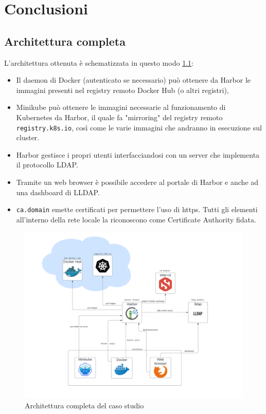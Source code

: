 \documentclass[12pt]{report}
\begin{document}
\chapter{Conclusioni}
\section{Architettura completa}
L'architettura ottenuta è schematizzata in questo modo \ref{image:gen-arch}:
\begin{itemize}
    \item Il daemon di Docker (autenticato se necessario) può ottenere da Harbor le immagini presenti nel registry remoto Docker Hub (o altri registri),
    \item Minikube può ottenere le immagini necessarie al funzionamento di Kubernetes da Harbor, il quale fa "mirroring" del registry remoto \texttt{registry.k8s.io}, così come le varie immagini che andranno in esecuzione sul cluster.
    \item Harbor gestisce i propri utenti interfacciandosi con un server che implementa il protocollo LDAP.
    \item Tramite un web browser è possibile accedere al portale di Harbor e anche ad una dashboard di LLDAP.
    \item \texttt{ca.domain} emette certificati per permettere l'uso di https. Tutti gli elementi all'interno della rete locale la riconoscono come Certificate Authority fidata.
\end{itemize}
\begin{figure}[h]
    \centering
    \includegraphics[width=\textwidth]{images/arch-gen.png}
    \caption{Architettura completa del caso studio}
    \label{image:gen-arch}
\end{figure}
\end{document}
